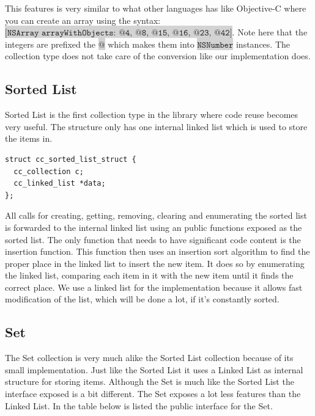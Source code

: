 \documentclass[table]{ituthesis}
\newcommand{\highlight}[1]{\colorbox{lightGray}{$\displaystyle \texttt{#1}$}}
\begin{document}
	This features is very similar to what other languages has like Objective-C where you can create an array using the syntax:\\
	\highlight{[NSArray arrayWithObjects: @4, @8, @15, @16, @23, @42]}. Note here that the integers are prefixed the \highlight{@} which makes them into \highlight{NSNumber} instances. The collection type does not take care of the conversion like our implementation does.
	
	\subsection{Sorted List}
	
	Sorted List is the first collection type in the library where code reuse becomes very useful. The structure only has one internal linked list which is used to store the items in.
	
\begin{lstlisting}[label=cc_sorted_list-struct,caption=Internal representation of Sorted List]
struct cc_sorted_list_struct {
  cc_collection c;
  cc_linked_list *data;
};
\end{lstlisting}

	All calls for creating, getting, removing, clearing and enumerating the sorted list is forwarded to the internal linked list using an public functions exposed as the sorted list. The only function that needs to have significant code content is the insertion function. This function then uses an insertion sort algorithm to find the proper place in the linked list to insert the new item. It does so by enumerating the linked list, comparing each item in it with the new item until it finds the correct place. We use a linked list for the implementation because it allows fast modification of the list, which will be done a lot, if it's constantly sorted.
	
	\subsection{Set}
	
	The Set collection is very much alike the Sorted List collection because of its small implementation. Just like the Sorted List it uses a Linked List as internal structure for storing items. Although the Set is much like the Sorted List the interface exposed is a bit different. The Set exposes a lot less features than the Linked List. In the table below is listed the public interface for the Set.
	
\end{document}
